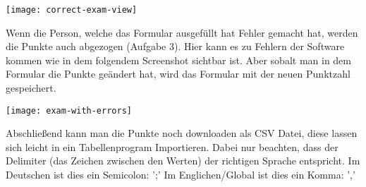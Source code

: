 \texttt{[image: correct-exam-view]}

Wenn die Person, welche das Formular ausgef\"ullt hat Fehler gemacht hat, werden die Punkte auch abgezogen (Aufgabe 3).
Hier kann es zu Fehlern der Software kommen wie in dem folgendem Screenshot sichtbar ist.
Aber sobalt man in dem Formular die Punkte ge\"andert hat, wird das Formular mit der neuen Punktzahl gespeichert.

\texttt{[image: exam-with-errors]}


Abschlie{\ss}end kann man die Punkte noch downloaden als CSV Datei, diese lassen sich leicht in ein Tabellenprogram Importieren.
Dabei nur beachten, dass der Delimiter (das Zeichen zwischen den Werten) der richtigen Sprache entspricht.
Im Deutschen ist dies ein Semicolon: ';'
Im Englichen/Global ist dies ein Komma: ','
